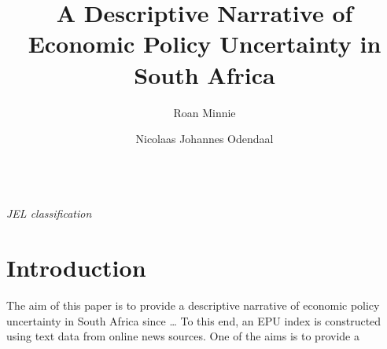 \documentclass[11pt,preprint, authoryear]{elsarticle}
\numberwithin{equation}{section}
\numberwithin{figure}{section}
\numberwithin{table}{section}
\begin{document}
\begin{frontmatter}  %

\title{A Descriptive Narrative of Economic Policy Uncertainty in South Africa}





\author[Add1]{Roan Minnie}

\author[Add2]{Nicolaas Johannes Odendaal}




\address[Add1]{Stellenbosch University, Stellenbosch, South Africa}
\address[Add2]{Stellenbosch University, Stellenbosch, South Africa; Bureau of Economic
Research, South Africa}



\vspace{1cm}

\begin{keyword}
\footnotesize{
 \\ \vspace{0.3cm}
\textit{JEL classification} 
}
\end{keyword}
\vspace{0.5cm}
\end{frontmatter}



\pagestyle{fancy}
\chead{}
\rhead{}
\lfoot{}
\lhead{}
\cfoot{}


\headsep 35pt %




\section{\texorpdfstring{Introduction
\label{sec_intro}}{Introduction }}\label{introduction}

The aim of this paper is to provide a descriptive narrative of economic
policy uncertainty in South Africa since \ldots{} To this end, an EPU
index is constructed using text data from online news sources. One of
the aims is to provide a
\end{document}
